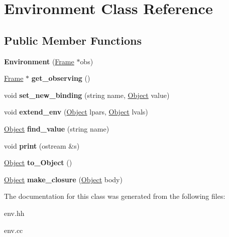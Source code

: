 \hypertarget{classEnvironment}{\section{Environment Class Reference}
\label{classEnvironment}
}
\subsection*{Public Member Functions}
\begin{DoxyCompactItemize}
\item 
\hypertarget{classEnvironment_acdb77ec0b3bc9b6b48ce430a8ff8d16d}{{\bfseries Environment} (\hyperlink{classFrame}{Frame} $\ast$obs)}\label{classEnvironment_acdb77ec0b3bc9b6b48ce430a8ff8d16d}

\item 
\hypertarget{classEnvironment_a73a2cb3642111c86485f48e70e5e4870}{\hyperlink{classFrame}{Frame} $\ast$ {\bfseries get\-\_\-observing} ()}\label{classEnvironment_a73a2cb3642111c86485f48e70e5e4870}

\item 
\hypertarget{classEnvironment_adac8db22e668d2a78a2cc18d0528c396}{void {\bfseries set\-\_\-new\-\_\-binding} (string name, \hyperlink{classCell}{Object} value)}\label{classEnvironment_adac8db22e668d2a78a2cc18d0528c396}

\item 
\hypertarget{classEnvironment_a29feed86a6e592d20f8c8882fcd35d6c}{void {\bfseries extend\-\_\-env} (\hyperlink{classCell}{Object} lpars, \hyperlink{classCell}{Object} lvals)}\label{classEnvironment_a29feed86a6e592d20f8c8882fcd35d6c}

\item 
\hypertarget{classEnvironment_aaa0fcf257cf27f961e51a9602cc2cb48}{\hyperlink{classCell}{Object} {\bfseries find\-\_\-value} (string name)}\label{classEnvironment_aaa0fcf257cf27f961e51a9602cc2cb48}

\item 
\hypertarget{classEnvironment_a61952d5ef784bff91ce1a66d6a00dc99}{void {\bfseries print} (ostream \&s)}\label{classEnvironment_a61952d5ef784bff91ce1a66d6a00dc99}

\item 
\hypertarget{classEnvironment_ace71e43a313cdeefb1e445ecef61825b}{\hyperlink{classCell}{Object} {\bfseries to\-\_\-\-Object} ()}\label{classEnvironment_ace71e43a313cdeefb1e445ecef61825b}

\item 
\hypertarget{classEnvironment_a852ae1aa43ba278c27a91e8dcc968086}{\hyperlink{classCell}{Object} {\bfseries make\-\_\-closure} (\hyperlink{classCell}{Object} body)}\label{classEnvironment_a852ae1aa43ba278c27a91e8dcc968086}

\end{DoxyCompactItemize}


The documentation for this class was generated from the following files\-:\begin{DoxyCompactItemize}
\item 
env.\-hh\item 
env.\-cc\end{DoxyCompactItemize}
